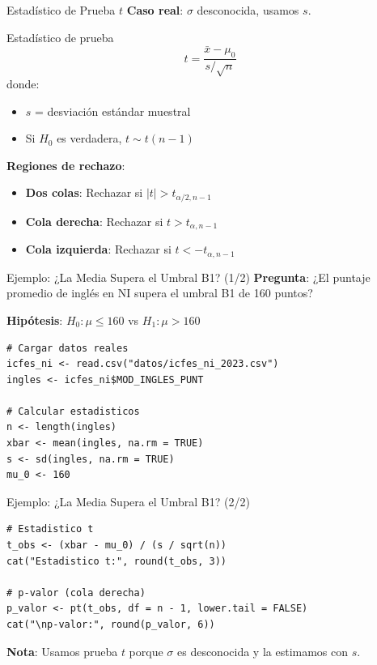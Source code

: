 \documentclass[aspectratio=169, 11pt]{beamer}
\begin{document}
\begin{frame}{Estadístico de Prueba $t$}
\textbf{Caso real}: $\sigma$ desconocida, usamos $s$.

\vspace{0.3cm}
\begin{block}{Estadístico de prueba}
\[
t = \frac{\bar{x} - \mu_0}{s / \sqrt{n}}
\]
donde:
\begin{itemize}
  \item $s$ = desviación estándar muestral
  \item Si $H_0$ es verdadera, $t \sim t(n-1)$
\end{itemize}
\end{block}

\vspace{0.3cm}
\textbf{Regiones de rechazo}:
\begin{itemize}
  \item \textbf{Dos colas}: Rechazar si $|t| > t_{\alpha/2, n-1}$
  \item \textbf{Cola derecha}: Rechazar si $t > t_{\alpha, n-1}$
  \item \textbf{Cola izquierda}: Rechazar si $t < -t_{\alpha, n-1}$
\end{itemize}
\end{frame}

\begin{frame}[fragile]{Ejemplo: ¿La Media Supera el Umbral B1? (1/2)}
\textbf{Pregunta}: ¿El puntaje promedio de inglés en NI supera el umbral B1 de 160 puntos?

\smallskip
\textbf{Hipótesis}: $H_0: \mu \leq 160$ \quad vs \quad $H_1: \mu > 160$

\begin{lstlisting}
# Cargar datos reales
icfes_ni <- read.csv("datos/icfes_ni_2023.csv")
ingles <- icfes_ni$MOD_INGLES_PUNT

# Calcular estadisticos
n <- length(ingles)
xbar <- mean(ingles, na.rm = TRUE)
s <- sd(ingles, na.rm = TRUE)
mu_0 <- 160
\end{lstlisting}
\end{frame}

\begin{frame}[fragile]{Ejemplo: ¿La Media Supera el Umbral B1? (2/2)}
\begin{lstlisting}
# Estadistico t
t_obs <- (xbar - mu_0) / (s / sqrt(n))
cat("Estadistico t:", round(t_obs, 3))

# p-valor (cola derecha)
p_valor <- pt(t_obs, df = n - 1, lower.tail = FALSE)
cat("\np-valor:", round(p_valor, 6))
\end{lstlisting}

\vspace{0.3cm}
\textbf{Nota}: Usamos prueba $t$ porque $\sigma$ es desconocida y la estimamos con $s$.
\end{frame}
\end{document}
